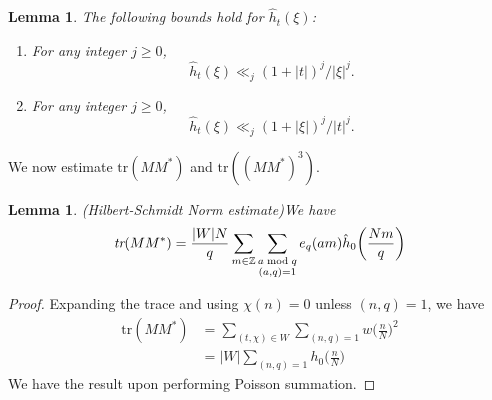 \documentclass[12pt]{amsart}
\newtheorem{lemma}[theorem]{Lemma}
\theoremstyle{definition}
\theoremstyle{plain}
\theoremstyle{remark}
\numberwithin{equation}{section}
\numberwithin{theorem}{section}
\numberwithin{equation}{section}
\begin{document}
	\begin{lemma}\label{efh} The following bounds hold for $\hat{h}_t(\xi)$: 
		\begin{enumerate} 
			\item For any integer $j \geq 0$, 
			\[\hat{h}_{t}(\xi) \ll_{j} (1+|t|)^{j}/|\xi|^{j}.\]
			\item For any integer $j \geq 0$, 	\[\hat{h}_{t}(\xi) \ll_{j} (1+|\xi|)^{j}/|t|^{j}.\] \end{enumerate} 
	\end{lemma}
	
	We now estimate $\mbox{tr}(MM^{*})$ and $\mbox{tr}((MM^{*})^{3})$.
	\begin{lemma}(Hilbert-Schmidt Norm estimate)\label{trace_calc}
		We have
		\[\emph{tr}(MM^{*})=
		\frac{|W|N}{q}\sum_{m \in \mathbb {Z}}\sum_{\substack{a \bmod q \\ (a,q)=1}}e_q(am)\hat{h}_{0}\bigg(\frac{Nm}{q}\bigg)
		\]
	\end{lemma}
	\begin{proof}
		Expanding the trace and using $\chi(n)=0$ unless $(n, q)=1$, we have 
		\begin{align*}
			\mbox{tr}(MM^{*})&=\sum_{(t, \chi) \in W} \sum_{(n,q)=1}w\bigg(\frac{n}{N}\bigg)^{2}
			\\
			&=|W|\sum_{(n,q)=1}h_{0}\bigg(\frac{n}{N}\bigg)
		\end{align*}
		We have the result upon performing Poisson summation.
	\end{proof}
	
\end{document}
